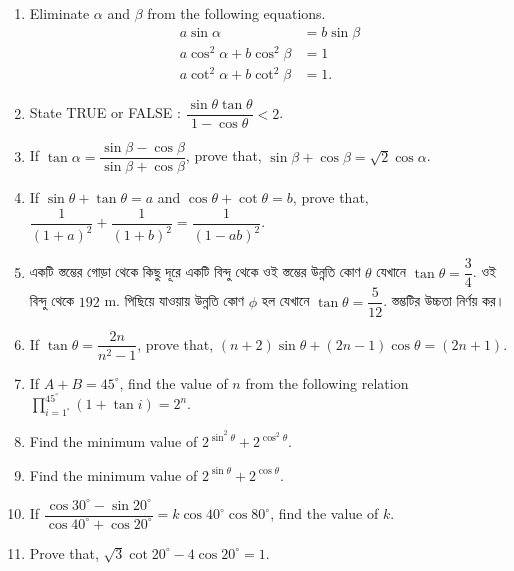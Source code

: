 \documentclass[11pt, a4paper]{article}
\begin{document}
\begin{enumerate}
	\item Eliminate $\alpha$ and $\beta$ from the following equations.
	\begin{align*}
	a \sin \alpha &= b \sin \beta \\
	a \cos^2 \alpha + b \cos^2 \beta &= 1 \\
	a \cot^2 \alpha + b \cot^2 \beta &= 1.	
	\end{align*}

	\item State TRUE or FALSE : $\dfrac{\sin \theta \tan \theta}{1 - \cos \theta} < 2$.
	
	\item If $\tan \alpha = \dfrac{\sin \beta - \cos \beta}{\sin \beta + \cos \beta}$, prove that, $\sin \beta + \cos \beta = \sqrt{2} \cos \alpha$.
	
	\item If $\sin \theta + \tan \theta = a$ and $\cos \theta + \cot \theta = b$, prove that, $\dfrac{1}{(1+a)^2} + \dfrac{1}{(1+b)^2} = \dfrac{1}{(1-ab)^2}$.
	
	\item \textbengali{একটি স্তম্ভের গোড়া থেকে কিছু দূরে একটি বিন্দু থেকে ওই স্তম্ভের উন্নতি কোণ} $\theta$ \textbengali{যেখানে} $\tan \theta = \dfrac{3}{4}$. \textbengali{ওই বিন্দু থেকে} $192$ m. \textbengali{পিছিয়ে যাওয়ায় উন্নতি কোণ} $\phi$ \textbengali{হল যেখানে} $\tan \theta = \dfrac{5}{12}$. \textbengali{স্তম্ভটির উচ্চতা নির্ণয় কর।}
	
	\item If $\tan \theta = \dfrac{2n}{n^2 - 1}$, prove that, $(n+2)\sin \theta + (2n - 1)\cos \theta = (2n+1)$.
	
	\item If $A + B = 45^{\circ}$, find the value of $n$ from the following relation $\displaystyle{\prod \limits_{i = 1^{\circ}}^{45^{\circ}} \left( 1 + \tan i \right) = 2^n}$.
	
	\item Find the minimum value of $2^{\sin^2 \theta} + 2^{\cos^2 \theta}$.
	
	\item Find the minimum value of $2^{\sin \theta} + 2^{\cos \theta}$.
	
	\item If $\dfrac{\cos 30^{\circ} - \sin 20^{\circ}}{\cos 40^{\circ} + \cos 20^{\circ}} = k \cos 40^{\circ} \cos 80^{\circ}$, find the value of $k$.
	
	\item Prove that, $\sqrt{3} \cot 20^{\circ} - 4 \cos 20^{\circ} = 1$.
	

\end{enumerate}
\end{document}

